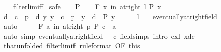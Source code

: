 \begin{isabellebody}
%
\isadelimproof
\ \ %
\endisadelimproof
%
\isatagproof
{}\isamarkupfalse%
\ filterlim{\isacharunderscore}{\kern0pt}iff\isanewline
{}\isamarkupfalse%
\ safe\isanewline
\ \ \isamarkupfalse%
\ P\isanewline
\ \ \isamarkupfalse%
\ {\isachardoublequoteopen}{\isasymforall}\isactrlsub F\ x\ in\ at{\isacharunderscore}{\kern0pt}right\ l{\isachardot}{\kern0pt}\ P\ x{\isachardoublequoteclose}\isanewline
\ \ \isamarkupfalse%
\ \isamarkupfalse%
\ d\ \ {\isachardoublequoteopen}c\ {\isacharasterisk}{\kern0pt}\ p\ {\isacharless}{\kern0pt}\ d{\isachardoublequoteclose}\ {\isachardoublequoteopen}{\isasymAnd}y{\isachardot}{\kern0pt}\ y\ {\isachargreater}{\kern0pt}\ c\ {\isacharasterisk}{\kern0pt}\ p\ {\isasymLongrightarrow}\ y\ {\isacharless}{\kern0pt}\ d\ {\isasymLongrightarrow}\ P\ y{\isachardoublequoteclose}\isanewline
\ \ \ \ \isamarkupfalse%
\ {\isacartoucheopen}l\ {\isacharequal}{\kern0pt}\ {\isacharunderscore}{\kern0pt}\ {\isacartoucheclose}\ eventually{\isacharunderscore}{\kern0pt}at{\isacharunderscore}{\kern0pt}right{\isacharunderscore}{\kern0pt}field\isanewline
\ \ \ \ \isamarkupfalse%
\ auto\isanewline
\ \ \isamarkupfalse%
\ \isamarkupfalse%
\ {\isachardoublequoteopen}{\isasymforall}\isactrlsub F\ a\ in\ at{\isacharunderscore}{\kern0pt}right\ p{\isachardot}{\kern0pt}\ P\ {\isacharparenleft}{\kern0pt}c\ {\isacharasterisk}{\kern0pt}\ a{\isacharparenright}{\kern0pt}{\isachardoublequoteclose}\isanewline
\ \ \ \ \isamarkupfalse%
\ {\isacharparenleft}{\kern0pt}auto\ simp{\isacharcolon}{\kern0pt}\ eventually{\isacharunderscore}{\kern0pt}at{\isacharunderscore}{\kern0pt}right{\isacharunderscore}{\kern0pt}field\ {\isacartoucheopen}{}\ {\isacharless}{\kern0pt}\ c{\isacartoucheclose}\ field{\isacharunderscore}{\kern0pt}simps\ intro{\isacharbang}{\kern0pt}{\isacharcolon}{\kern0pt}\ exI{\isacharbrackleft}{\kern0pt}\ x{\isacharequal}{\kern0pt}{\isachardoublequoteopen}d{\isacharslash}{\kern0pt}c{\isachardoublequoteclose}{\isacharbrackright}{\kern0pt}{\isacharparenright}{\kern0pt}\isanewline
\ \ \isamarkupfalse%
\ that{\isacharparenleft}{\kern0pt}{}{\isacharparenright}{\kern0pt}{\isacharbrackleft}{\kern0pt}unfolded\ filterlim{\isacharunderscore}{\kern0pt}iff{\isacharcomma}{\kern0pt}\ rule{\isacharunderscore}{\kern0pt}format{\isacharcomma}{\kern0pt}\ OF\ this{\isacharbrackright}{\kern0pt}\isanewline
\ \ \isamarkupfalse%

\end{isabellebody}
